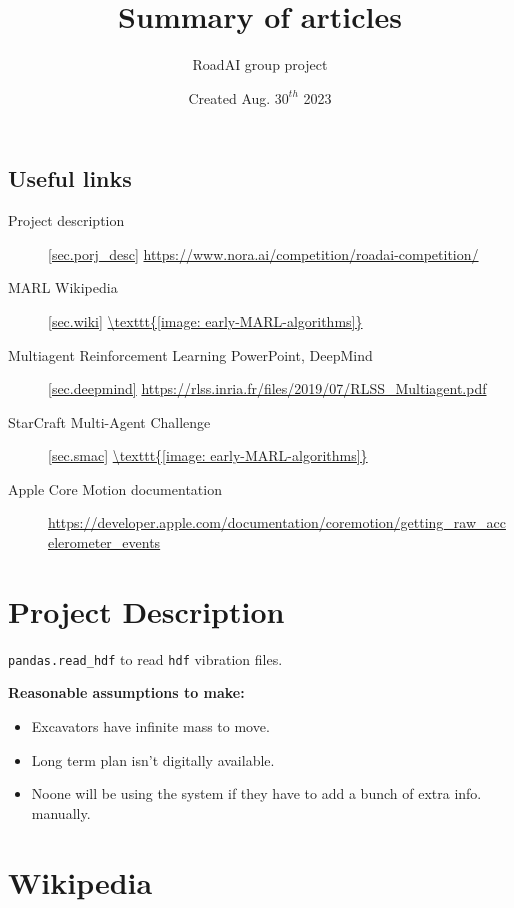\documentclass{article}
\title{Summary of articles}
\author{RoadAI group project}
\date{Created Aug. $30^{th}$ 2023}
\begin{document}
\begin{titlepage}
\maketitle
\end{titlepage}

\subsection*{Useful links}
\begin{description}
  \item[Project description]\ref{sec.porj_desc} \url{https://www.nora.ai/competition/roadai-competition/}
  \item[MARL Wikipedia]\ref{sec.wiki} \url{\texttt{[image: early-MARL-algorithms]}}
  \item[Multiagent Reinforcement Learning PowerPoint, DeepMind]\ref{sec.deepmind} \url{https://rlss.inria.fr/files/2019/07/RLSS_Multiagent.pdf}
  \item[StarCraft Multi-Agent Challenge]\ref{sec.smac} \url{\texttt{[image: early-MARL-algorithms]}}
  \item[Apple Core Motion documentation] \url{https://developer.apple.com/documentation/coremotion/getting_raw_accelerometer_events}
\end{description}


\section*{Project Description}          \label{sec.proj_desc}
\texttt{pandas.read_hdf} to read \texttt{hdf} vibration files.

\noindent
\textbf{Reasonable assumptions to make:}
\begin{itemize}
  \item Excavators have infinite mass to move.\\
  \item Long term plan isn't digitally available.\\
  \item Noone will be using the system if they have to add a bunch of extra info. manually.
\end{itemize}


\section*{Wikipedia}          \label{sec.wiki}
\end{document}
